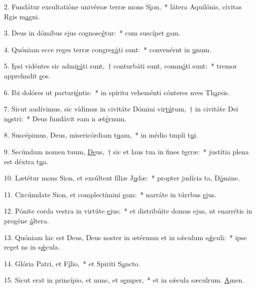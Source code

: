 2. Fundátur exsultatióne univérsæ terræ mons S\uline{i}on,~* látera Aquilónis, cívitas Rgis m\uline{a}gni.\par 
3. Deus in dómibus ejus cognosc\uline{é}tur:~* cum suscípet \uline{e}am.\par 
4. Quóniam ecce reges terræ congreg\uline{á}ti sunt:~* convenérnt in \uline{u}num.\par 
5. Ipsi vidéntes sic admi\uline{rá}ti sunt,~† conturbáti sunt, comm\uline{ó}ti sunt:~* tremor apprehndit \uline{e}os.\par 
6. Ibi dolóres ut parturi\uline{é}ntis:~* in spíritu veheménti cónteres nves Th\uline{a}rsis.\par 
7. Sicut audívimus, sic vídimus in civitáte Dómini vir\uline{tú}tum,~† in civitáte Dei n\uline{o}stri:~* Deus fundávit eam n æt\uline{é}rnum.\par 
8. Suscépimus, Deus, misericórdiam t\uline{u}am,~* in médio tmpli t\uline{u}i.\par 
9. Secúndum nomen tuum, \uline{De}us,~† sic et laus tua in fines t\uline{e}rræ:~* justítia plena est déxtra t\uline{u}a.\par 
10. Lætétur mons Sion, et exsúltent fíliæ J\uline{u}dæ:~* propter judícia ta, D\uline{ó}mine.\par 
11. Circúmdate Sion, et complectímini \uline{e}am:~* narráte in túrrbus \uline{e}jus.\par 
12. Pónite corda vestra in virtúte \uline{e}jus:~* et distribúite domus ejus, ut enarrétis in progéne \uline{á}ltera.\par 
13. Quóniam hic est Deus, Deus noster in ætérnum et in sǽculum s\uline{ǽ}culi:~* ipse reget ns in s\uline{ǽ}cula.\par 
14. Glória Patri, et F\uline{í}lio,~* et Spiríti S\uline{a}ncto.\par 
15. Sicut erat in princípio, et nunc, et s\uline{e}mper,~* et in sǽcula sæculrum. \uline{A}men.\par 
